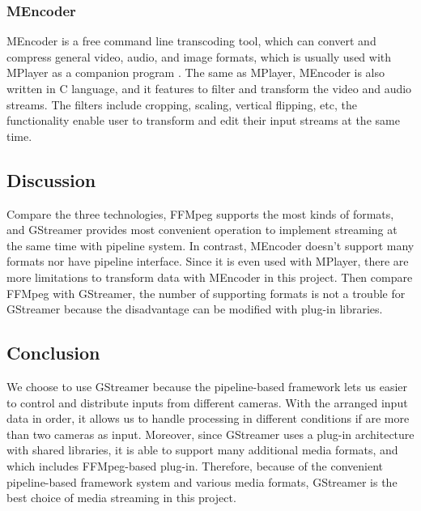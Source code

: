 \documentclass[letterpaper,10pt,serif,draftclsnofoot,onecolumn,compsoc,titlepage]{IEEEtran}
\begin{document}
\subsubsection{MEncoder}
MEncoder is a free command line transcoding tool, which can convert and compress general video, audio, 
and image formats, which is usually used with MPlayer as a companion program \cite{mplay}. The same as MPlayer, 
MEncoder is also written in C language, and it features to filter and transform the video and audio 
streams. The filters include cropping, scaling, vertical flipping, etc, the functionality enable user to 
transform and edit their input streams at the same time.\\

\subsection{Discussion}
Compare the three technologies, FFMpeg supports the most kinds of formats, and GStreamer provides most 
convenient operation to implement streaming at the same time with pipeline system. In contrast, MEncoder 
doesn’t support many formats nor have pipeline interface. Since it is even used with MPlayer, there are 
more limitations to transform data with MEncoder in this project. Then compare FFMpeg with GStreamer, the 
number of supporting formats is not a trouble for GStreamer because the disadvantage can be modified with 
plug-in libraries.\\

\subsection{Conclusion}
We choose to use GStreamer because the pipeline-based framework lets us easier to control and distribute 
inputs from different cameras. With the arranged input data in order, it allows us to handle processing 
in different conditions if are more than two cameras as input. Moreover, since GStreamer uses a plug-in 
architecture with shared libraries, it is able to support many additional media formats, and which 
includes FFMpeg-based plug-in. Therefore, because of the convenient pipeline-based framework system and 
various media formats, GStreamer is the best choice of media streaming in this project.\\



\cite{lable}


\end{document}
